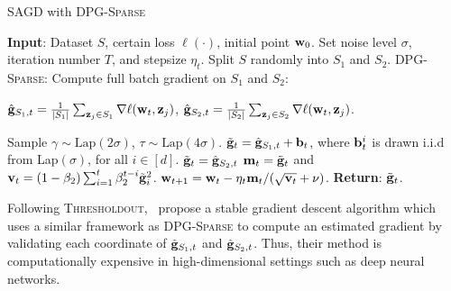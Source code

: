 \documentclass[11pt]{article}
\begin{document}
\begin{algorithm}[H]
\caption{\textsc{SAGD} with \textsc{DPG-Sparse}}
\begin{algorithmic}[1]
\label{algo: sparse}
\STATE \textbf{Input}: Dataset $S$,  certain loss $\ell(\cdot)$, initial point $\mathbf{w}_0$.
\STATE Set  noise level $\sigma$, iteration number $T$,  and stepsize $\eta_t$.
\STATE Split $S$ randomly into $S_1$ and $S_2$. 
\STATE   \textsc{DPG-Sparse:} Compute full batch gradient on $S_1$ and $S_2$:\\
\centerline{$\hat {\mathbf{g}}_{S_1,t} = \frac{1}{|S_1|} \sum_{\mathbf{z}_j \in S_1}\nabla \ell(\mathbf{w}_t, \mathbf{z}_j)$,%
\hspace{0.2in}
$\hat {\mathbf{g}}_{S_2,t} = \frac{1}{|S_2|} \sum_{\mathbf{z}_j \in S_2}\nabla \ell(\mathbf{w}_t, \mathbf{z}_j)$.}
\STATE Sample $\gamma \sim \text{Lap}(2\sigma)$, $\tau \sim \text{Lap}(4\sigma)$.
\STATE  $\tilde {\mathbf{g}}_t = \hat {\mathbf{g}}_{S_1,t} + \mathbf{b}_t$, where $\mathbf{b}_t^i$ is drawn i.i.d from Lap$(\sigma)$, for all $ i \in [d]$.
\ELSE \STATE $\tilde {\mathbf{g}}_t = \hat {\mathbf{g}}_{S_2,t}$
\ENDIF
\STATE 
$\mathbf{m}_t = \tilde {\mathbf{g}}_t$ and $\mathbf{v}_t = \left(1-\beta_{2}\right) \sum_{i=1}^{t} \beta_{2}^{t-i} \tilde {\mathbf{g}}_{i}^{2}$.
\STATE $\mathbf{w}_{t+1}=\mathbf{w}_{t}-\eta_t \mathbf{m}_t /(\sqrt{\mathbf{v}_t}+\nu)$.
\ENDFOR 
\STATE \textbf{Return}: $\tilde {\mathbf{g}}_t$.
\end{algorithmic}
\end{algorithm}

Following \textsc{Thresholdout},~\citep{zhch2018} propose a stable gradient descent algorithm which uses a similar framework as \textsc{DPG-Sparse} to compute an estimated gradient by validating each coordinate of $\hat {\mathbf{g}}_{S_1,t}$ and $\hat {\mathbf{g}}_{S_2,t}$. 
Thus, their method is computationally expensive in high-dimensional settings such as deep neural networks. 
\end{document}
